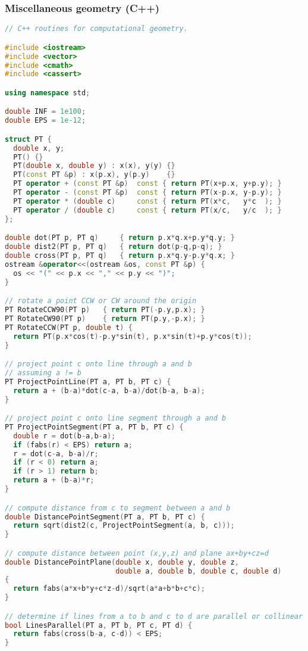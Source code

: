 \subsubsection{Miscellaneous geometry (C++)}
\begin{lstlisting}[language=C++]
// C++ routines for computational geometry.

#include <iostream>
#include <vector>
#include <cmath>
#include <cassert>

using namespace std;

double INF = 1e100;
double EPS = 1e-12;

struct PT { 
  double x, y; 
  PT() {}
  PT(double x, double y) : x(x), y(y) {}
  PT(const PT &p) : x(p.x), y(p.y)    {}
  PT operator + (const PT &p)  const { return PT(x+p.x, y+p.y); }
  PT operator - (const PT &p)  const { return PT(x-p.x, y-p.y); }
  PT operator * (double c)     const { return PT(x*c,   y*c  ); }
  PT operator / (double c)     const { return PT(x/c,   y/c  ); }
};

double dot(PT p, PT q)     { return p.x*q.x+p.y*q.y; }
double dist2(PT p, PT q)   { return dot(p-q,p-q); }
double cross(PT p, PT q)   { return p.x*q.y-p.y*q.x; }
ostream &operator<<(ostream &os, const PT &p) {
  os << "(" << p.x << "," << p.y << ")"; 
}

// rotate a point CCW or CW around the origin
PT RotateCCW90(PT p)   { return PT(-p.y,p.x); }
PT RotateCW90(PT p)    { return PT(p.y,-p.x); }
PT RotateCCW(PT p, double t) { 
  return PT(p.x*cos(t)-p.y*sin(t), p.x*sin(t)+p.y*cos(t)); 
}

// project point c onto line through a and b
// assuming a != b
PT ProjectPointLine(PT a, PT b, PT c) {
  return a + (b-a)*dot(c-a, b-a)/dot(b-a, b-a);
}

// project point c onto line segment through a and b
PT ProjectPointSegment(PT a, PT b, PT c) {
  double r = dot(b-a,b-a);
  if (fabs(r) < EPS) return a;
  r = dot(c-a, b-a)/r;
  if (r < 0) return a;
  if (r > 1) return b;
  return a + (b-a)*r;
}

// compute distance from c to segment between a and b
double DistancePointSegment(PT a, PT b, PT c) {
  return sqrt(dist2(c, ProjectPointSegment(a, b, c)));
}

// compute distance between point (x,y,z) and plane ax+by+cz=d
double DistancePointPlane(double x, double y, double z,
                          double a, double b, double c, double d)
{
  return fabs(a*x+b*y+c*z-d)/sqrt(a*a+b*b+c*c);
}

// determine if lines from a to b and c to d are parallel or collinear
bool LinesParallel(PT a, PT b, PT c, PT d) { 
  return fabs(cross(b-a, c-d)) < EPS; 
}


\end{lstlisting}
